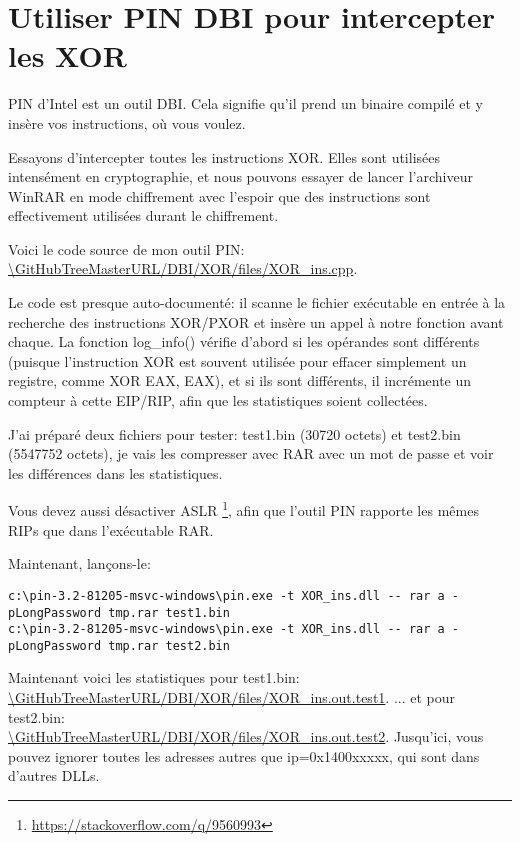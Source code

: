 \section{Utiliser PIN DBI pour intercepter les XOR}

\newcommand{\GitHubPinXORURL}{\GitHubTreeMasterURL/DBI/XOR/files}

PIN d'Intel est un outil \ac{DBI}.
Cela signifie qu'il prend un binaire compilé et y insère vos instructions, où vous
voulez.

Essayons d'intercepter toutes les instructions XOR.
Elles sont utilisées intensément en cryptographie, et nous pouvons essayer de lancer l'archiveur
WinRAR en mode chiffrement avec l'espoir que des instructions sont effectivement utilisées durant
le chiffrement.

Voici le code source de mon outil PIN: \url{\GitHubPinXORURL/XOR_ins.cpp}.

Le code est presque auto-documenté: il scanne le fichier exécutable en entrée à la recherche
des instructions XOR/PXOR et insère un appel à notre fonction avant chaque.
La fonction log\_info() vérifie d'abord si les opérandes sont différents (puisque
l'instruction XOR est souvent utilisée pour effacer simplement un registre, comme
XOR EAX, EAX), et si ils sont différents, il incrémente un compteur à cette EIP/RIP,
afin que les statistiques soient collectées.

J'ai préparé deux fichiers pour tester: test1.bin (30720 octets) et test2.bin (5547752 octets),
je vais les compresser avec RAR avec un mot de passe et voir les différences dans
les statistiques.

Vous devez aussi désactiver \ac{ASLR}
\footnote{\url{https://stackoverflow.com/q/9560993}},
afin que l'outil PIN rapporte les mêmes RIPs que dans l'exécutable RAR.

Maintenant, lançons-le:

\begin{lstlisting}
c:\pin-3.2-81205-msvc-windows\pin.exe -t XOR_ins.dll -- rar a -pLongPassword tmp.rar test1.bin
c:\pin-3.2-81205-msvc-windows\pin.exe -t XOR_ins.dll -- rar a -pLongPassword tmp.rar test2.bin
\end{lstlisting}

Maintenant voici les statistiques pour test1.bin: \\
\url{\GitHubPinXORURL/XOR_ins.out.test1}.
... et pour test2.bin: \\
\url{\GitHubPinXORURL/XOR_ins.out.test2}.
Jusqu'ici, vous pouvez ignorer toutes les adresses autres que ip=0x1400xxxxx, qui
sont dans d'autres DLLs.

